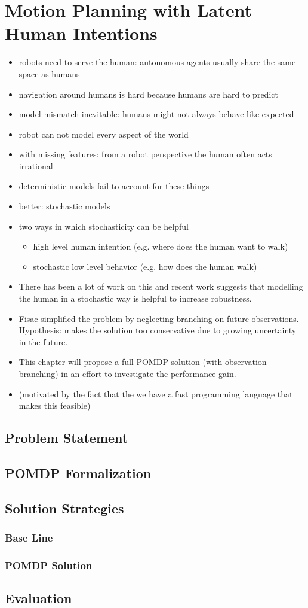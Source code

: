 \chapter{Motion Planning with Latent Human Intentions}\label{chap:hri}

\begin{itemize}
  \item robots need to serve the human: autonomous agents usually share the same space as humans
  \item navigation around humans is hard because humans are hard to predict
  \item model mismatch inevitable: humans might not always behave like expected
  \item robot can not model every aspect of the world
  \item with missing features: from a robot perspective the human often acts irrational
  \item deterministic models fail to account for these things
  \item better: stochastic models
  \item two ways in which stochasticity can be helpful
  \begin{itemize}
    \item high level human intention (e.g. where does the human want to walk)
    \item stochastic low level behavior (e.g. how does the human walk)
  \end{itemize}
  \item There has been a lot of work on this and recent work suggests that modelling the human in a stochastic way is helpful to increase robustness. \cite{fisac2018probabilistically}
  \item Fisac simplified the problem by neglecting branching on future observations. Hypothesis: makes the solution too conservative due to growing uncertainty in the future.
  \item This chapter will propose a full POMDP solution (with observation branching) in an effort to investigate the performance gain.
  \item (motivated by the fact that the we have a fast programming language that makes this feasible)
\end{itemize}

\section{Problem Statement}\label{sec:hri-problem-statement}
\section{POMDP Formalization}\label{sec:hri-pomdp-formalization}
\section{Solution Strategies}\label{sec:hri-solutions}
\subsection{Base Line}\label{sec:hri-base-line}
\subsection{POMDP Solution}\label{sec:hri-planners}
\section{Evaluation}\label{sec:hri-evaluation}
